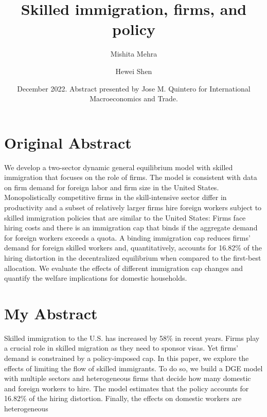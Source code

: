 \documentclass[12pt,oneside,reqno]{amsart}
\title{Skilled immigration, firms, and policy}
\author{Mishita Mehra \and Hewei Shen}
\date{December 2022. Abstract presented by Jose M. Quintero for International Macroeconomics and Trade.}
\begin{document}
\maketitle 

\section{Original Abstract}
We develop a two-sector dynamic general equilibrium model with skilled immigration that focuses on the role of firms. The model is consistent with data on firm demand for foreign labor and firm size in the United States. Monopolistically competitive firms in the skill-intensive sector differ in productivity and a subset of relatively larger firms hire foreign workers subject to skilled immigration policies that are similar to the United States: Firms face hiring costs and there is an immigration cap that binds if the aggregate demand for foreign workers exceeds a quota. A binding immigration cap reduces firms’ demand for foreign skilled workers and, quantitatively, accounts for 16.82\% of the hiring distortion in the decentralized equilibrium when compared to the first-best allocation. We evaluate the effects of different immigration cap changes and quantify the welfare implications for domestic households.

\section{My Abstract}
Skilled immigration to the U.S. has increased by 58\% in recent years. Firms play a crucial role in skilled migration as they need to sponsor visas. Yet firms' demand is constrained by a policy-imposed cap. In this paper, we explore the effects of limiting the flow of skilled immigrants. To do so, we build a DGE model with multiple sectors and heterogeneous firms that decide how many domestic and foreign workers to hire. The model estimates that the policy accounts for 16.82\% of the hiring distortion. Finally, the effects on domestic workers are heterogeneous
\end{document}
